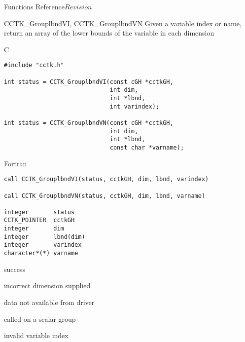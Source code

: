 \begin{cactuspart}{ Functions Reference}{}{$Revision$}
\begin{FunctionDescription}{CCTK\_GrouplbndVI, CCTK\_GrouplbndVN}
\label{CCTK-GrouplbndVI}
\label{CCTK-GrouplbndVN}
Given a variable index or name, return an array of the lower bounds of the variable in each dimension

\begin{SynopsisSection}
\begin{Synopsis}{C}
\begin{verbatim}
#include "cctk.h"

int status = CCTK_GrouplbndVI(const cGH *cctkGH,
                              int dim,
                              int *lbnd,
                              int varindex);

int status = CCTK_GrouplbndVN(const cGH *cctkGH,
                              int dim,
                              int *lbnd,
                              const char *varname);
\end{verbatim}
\end{Synopsis}
\begin{Synopsis}{Fortran}
\begin{verbatim}
call CCTK_GrouplbndVI(status, cctkGH, dim, lbnd, varindex)

call CCTK_GrouplbndVN(status, cctkGH, dim, lbnd, varname)

integer       status
CCTK_POINTER  cctkGH
integer       dim
integer       lbnd(dim)
integer       varindex
character*(*) varname
\end{verbatim}
\end{Synopsis}
\end{SynopsisSection}

\begin{ResultSection}
\begin{Result}{0} success \end{Result}
\begin{Result}{-1} incorrect dimension supplied \end{Result}
\begin{Result}{-2} data not available from driver \end{Result}
\begin{Result}{-3} called on a scalar group \end{Result}
\begin{Result}{-4} invalid variable index \end{Result}
\end{ResultSection}


\end{FunctionDescription}
\end{cactuspart}
